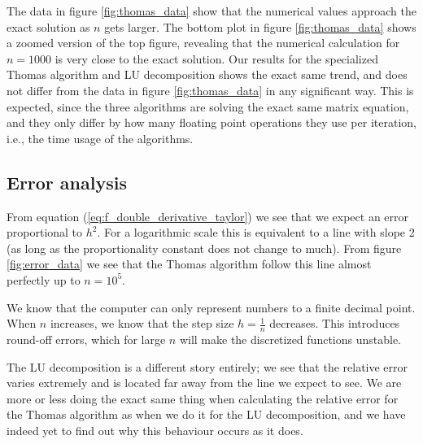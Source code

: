 \documentclass{emulateapj}
\begin{document}
The data in figure \ref{fig:thomas_data} show that the numerical values approach the exact solution as $n$ gets larger. The bottom plot in figure \ref{fig:thomas_data} shows a zoomed version of the top figure, revealing that the numerical calculation for $n=1000$ is very close to the exact solution. Our results for the specialized Thomas algorithm and LU decomposition shows the exact same trend, and does not differ from the data in figure \ref{fig:thomas_data} in any significant way. This is expected, since the three algorithms are solving the exact same matrix equation, and they only differ by how many floating point operations they use per iteration, i.e., the time usage of the algorithms. 

\subsection{Error analysis}

From equation (\ref{eq:f_double_derivative_taylor}) we see that we expect an error proportional to \(h^{2}\). For a logarithmic scale this is equivalent to a line with slope 2 (as long as the proportionality constant does not change to much). From figure \ref{fig:error_data} we see that the Thomas algorithm follow this line almost perfectly up to \(n=10^{5}\). 

We know that the computer can only represent numbers to a finite decimal point. When \(n\) increases, we know that the step size \(h = \frac{1}{n}\) decreases. This introduces round-off errors, which for large \(n\) will make the discretized functions unstable.

The LU decomposition is a different story entirely; we see that the relative error varies extremely and is located far away from the line we expect to see. We are more or less doing the exact same thing when calculating the relative error for the Thomas algorithm as when we do it for the LU decomposition, and we have indeed yet to find out why this behaviour occurs as it does.

\end{document}
